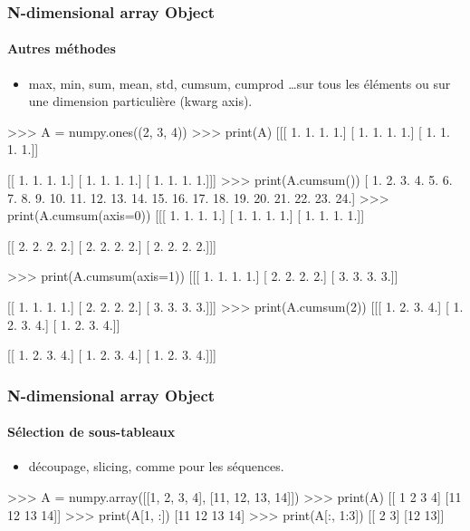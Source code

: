 \begin{frame}[fragile]
\frametitle{N-dimensional array Object}
\framesubtitle{Autres méthodes}
\begin{itemize}
 \item max, min, sum, mean, std, cumsum, cumprod \dots sur tous les éléments ou sur une dimension particulière (kwarg axis). 
\end{itemize}
\begin{minipage}{5cm}
\begin{pythonConsole}
>>> A = numpy.ones((2, 3, 4))
>>> print(A)
[[[ 1.  1.  1.  1.]
  [ 1.  1.  1.  1.]
  [ 1.  1.  1.  1.]]

 [[ 1.  1.  1.  1.]
  [ 1.  1.  1.  1.]
  [ 1.  1.  1.  1.]]]          
>>> print(A.cumsum())
[  1.   2.   3.   4.   5.   6.   7.   8.   9.  10.  11.  12.  13.  14.  15. 16.  17.  18.  19.  20.  21.  22.  23.  24.]
>>> print(A.cumsum(axis=0))
[[[ 1.  1.  1.  1.]
  [ 1.  1.  1.  1.]
  [ 1.  1.  1.  1.]]

 [[ 2.  2.  2.  2.]
  [ 2.  2.  2.  2.]
  [ 2.  2.  2.  2.]]]
\end{pythonConsole}
\end{minipage}
\begin{minipage}{5cm}
\begin{pythonConsole}
>>> print(A.cumsum(axis=1))
[[[ 1.  1.  1.  1.]
  [ 2.  2.  2.  2.]
  [ 3.  3.  3.  3.]]

 [[ 1.  1.  1.  1.]
  [ 2.  2.  2.  2.]
  [ 3.  3.  3.  3.]]]
>>> print(A.cumsum(2))
[[[ 1.  2.  3.  4.]
  [ 1.  2.  3.  4.]
  [ 1.  2.  3.  4.]]

 [[ 1.  2.  3.  4.]
  [ 1.  2.  3.  4.]
  [ 1.  2.  3.  4.]]]
\end{pythonConsole}
\end{minipage}
\end{frame}
\begin{frame}[fragile]
\frametitle{N-dimensional array Object}
\framesubtitle{Sélection de sous-tableaux}
\begin{itemize}
 \item découpage, slicing, comme pour les séquences.
\end{itemize}
\begin{pythonConsole}
>>> A = numpy.array([[1, 2, 3, 4], [11, 12, 13, 14]])
>>> print(A)
[[ 1  2  3  4]
 [11 12 13 14]]
>>> print(A[1, :])
[11 12 13 14]
>>> print(A[:, 1:3])
[[ 2  3]
 [12 13]]
\end{pythonConsole}
\end{frame}
